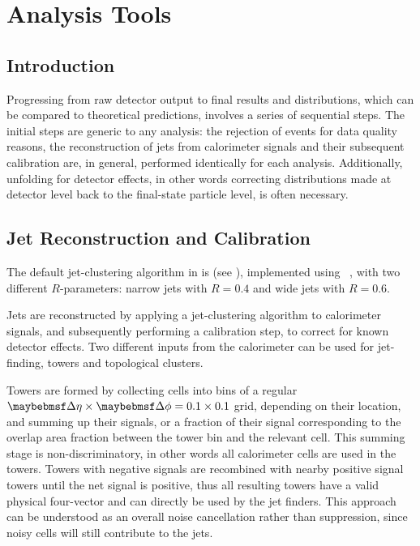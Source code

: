 \chapter{Analysis Tools}
\label{chap:analysis-tools}


\section{Introduction}
Progressing from raw detector output to final results and distributions, which can be compared to theoretical predictions, involves a series of sequential steps.
The initial steps are generic to any analysis: the rejection of events for data quality reasons, the reconstruction of jets from calorimeter signals and their subsequent calibration are, in general, performed identically for each analysis.
Additionally, unfolding for detector effects, in other words correcting distributions made at detector level back to the final-state particle level, is
often necessary.

\section{Jet Reconstruction and Calibration}
\label{sec:analysis-tools:jet_reconstruction}
The default jet-clustering algorithm in \ATLAS is \akt (see ), implemented using \fastjet~\cite{Cacciari:2005:fastjet,Cacciari:2012:fastjet}, with two different $R$-parameters: narrow jets with $R=0.4$ and wide jets with $R=0.6$.

Jets are reconstructed by applying a jet-clustering algorithm to calorimeter signals, and subsequently performing a calibration step, to correct for known detector effects.
Two different inputs from the calorimeter can be used for jet-finding, towers and topological clusters.

Towers are formed by collecting cells into bins of a regular $\DeltaEta \times \DeltaPhi = 0.1 \times 0.1$ grid, depending on their location, and summing up their signals, or a fraction of their signal corresponding to the overlap area fraction between the tower bin and the relevant cell.
This summing stage is non-discriminatory, in other words all calorimeter cells are used in the towers.
Towers with negative signals are recombined with nearby positive signal towers until the net signal is positive, thus all resulting towers have a valid physical four-vector and can directly be used by the jet finders.
This approach can be understood as an overall noise cancellation rather than suppression, since noisy cells will still contribute to the jets.

